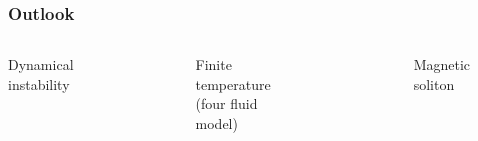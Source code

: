 \begin{frame}
\frametitle{Outlook}




\begin{columns}[t]
\textcolor{bellblue}{Dynamical instability}
\begin{figure}
\centering
\includegraphics[width=0.6\linewidth]{Figures/Instability.pdf}
\end{figure}
\vspace{0.4cm}

\textcolor{bellblue}{Finite temperature (four fluid model)}
\begin{figure}
\centering
\includegraphics[width=0.3\linewidth]{Figures/Thermal_Spinor.jpg}
\end{figure}
\\

	
\textcolor{bellblue}{Magnetic soliton}
\begin{figure}
\centering
\includegraphics[width=0.67\linewidth]{Figures/magneticsoliton.pdf}
\end{figure}


\end{columns}
\end{frame}
